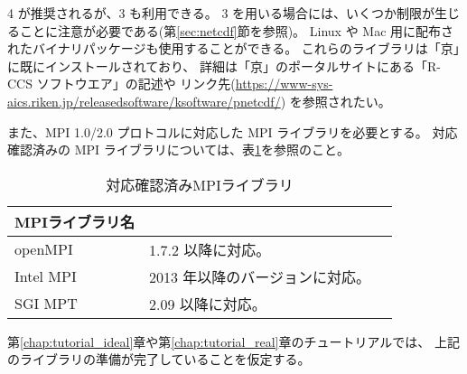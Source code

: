 {\netcdf}4 が推奨されるが、{\netcdf}3 も利用できる。
{\netcdf}3 を用いる場合には、いくつか制限が生じることに注意が必要である(第\ref{sec:netcdf}節を参照)。
Linux や Mac 用に配布されたバイナリパッケージも使用することができる。
これらの{\netcdf}ライブラリは「京」に既にインストールされており、
詳細は「京」のポータルサイトにある「R-CCS ソフトウエア」の記述や
リンク先(\url{https://www-sys-aics.riken.jp/releasedsoftware/ksoftware/pnetcdf/})
を参照されたい。

また、MPI 1.0/2.0 プロトコルに対応した MPI ライブラリを必要とする。
対応確認済みの MPI ライブラリについては、表\ref{tab:compatible_mpi}を参照のこと。

\begin{table}[htb]
\begin{center}
\caption{対応確認済みMPIライブラリ}
\begin{tabularx}{150mm}{|l|X|X|} \hline
 \rowcolor[gray]{0.9} MPIライブラリ名 & \\ \hline
 openMPI   & 1.7.2 以降に対応。 \\ \hline
 Intel MPI & 2013 年以降のバージョンに対応。 \\ \hline
 SGI MPT   & 2.09 以降に対応。 \\ \hline
\end{tabularx}
\label{tab:compatible_mpi}
\end{center}
\end{table}

第\ref{chap:tutorial_ideal}章や第\ref{chap:tutorial_real}章のチュートリアルでは、
上記のライブラリの準備が完了していることを仮定する。

